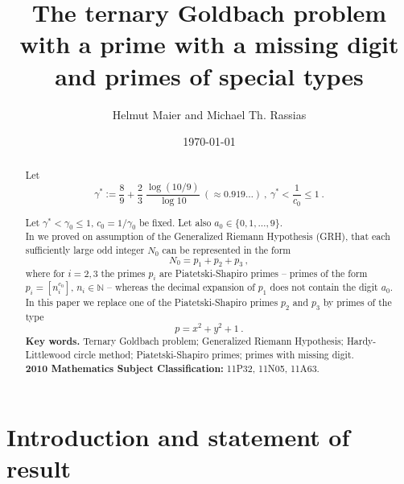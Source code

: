 \documentclass{amsart}
\title{The ternary Goldbach problem with a prime with a missing digit and primes of special types}
\author{Helmut Maier and Michael Th. Rassias}
\date{\today}
\numberwithin{equation}{subsection}
\begin{document}
 \maketitle
 
\begin{abstract} 
Let 
$$\gamma^*:=\frac{8}{9}+\frac{2}{3}\:\frac{\log(10/9)}{\log 10}\:(\approx 0.919\ldots)\:,\ \gamma^*<\frac{1}{c_0}\leq 1\:.$$

Let $\gamma^*<\gamma_0\leq 1$, $c_0=1/\gamma_0$ be fixed. Let also $a_0\in\{0,1,\ldots, 9\}$.\\
In \cite{maier-rassias-gold} we proved on assumption of the Generalized Riemann Hypothesis (GRH), that each sufficiently large odd integer $N_0$ can be represented in the form 
$$N_0=p_1+p_2+p_3\:,$$
where for $i=2, 3$ the primes $p_i$ are Piatetski-Shapiro primes -- primes of the form $p_i=[n_i^{c_0}]$, $n_i\in\mathbb{N}$ --  whereas the decimal expansion of $p_1$ does not contain the digit $a_0$.\\
In this paper we replace one of the Piatetski-Shapiro primes $p_2$ and $p_3$ by primes of the type
$$p=x^2+y^2+1\:.$$
 \textbf{Key words.} Ternary Goldbach problem; Generalized Riemann Hypothesis; Hardy-Littlewood circle method; Piatetski-Shapiro primes; primes with missing digit.\\ 
\textbf{2010 Mathematics Subject Classification:} 11P32, 11N05, 11A63.%
\newline
\end{abstract}



\section{Introduction and statement of result}
\end{document}
